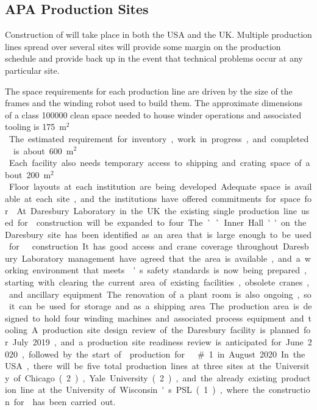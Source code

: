 \subsection{APA Production Sites}
\label{sec:fdsp-apa-prod-facility}

Construction of   will take place in both the USA and the UK.  Multiple  production lines spread over several sites will provide some margin on the production schedule and provide back up in the event that technical problems occur at any particular site. 

The space requirements for each production line are driven by the size of the  frames and the winding robot used to build them. The approximate dimensions of a class \num{100000} clean space needed to house winder operations and associated tooling is \SI{175}{m$^2$}. The estimated requirement for inventory, work in progress, and completed  is about \SI{600}{m$^2$}. Each facility  also needs temporary access to shipping and crating space of about \SI{200}{m$^2$}. Floor layouts at each institution are being developed. Adequate space is available at each site, and the institutions have offered commitments for space for . 

At Daresbury Laboratory in the UK the existing single production line used for  construction will be expanded to four.  The ``Inner Hall'' on the Daresbury site has been identified as an area that is large enough to be used for   construction. It has good access and crane coverage throughout. Daresbury Laboratory management have agreed that the area is available, and a working environment that meets 's safety standards is now being prepared, starting with clearing the current area of existing facilities, obsolete cranes, and ancillary equipment. The renovation of a plant room is also ongoing, so it can be used for storage and as a shipping area. The production area is designed to hold four winding machines and associated process equipment and tooling.  A production site design review of the Daresbury facility is planned for July 2019, and a production site readiness review is anticipated for June 2020, followed by the start of  production for   \#1 in August 2020. 

In the USA, there will be five total production lines at three sites at the University of Chicago (2), Yale University (2), and the already existing production line at the University of Wisconsin's PSL (1),  where the construction for  has been carried out. 

